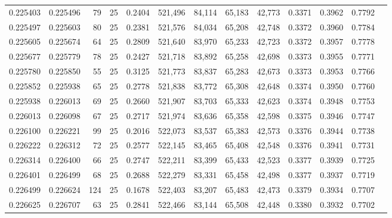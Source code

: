 \begin{tabular}{rrrrrrrrrrrrr}
0.225403 & 0.225496 &    79 &  25 &                                     0.2404 & 521,496 &  84,114 &  65,183 &  42,773 & 0.3371 & 0.3962 & 0.7792 \\
0.225497 & 0.225603 &    80 &  25 &                                     0.2381 & 521,576 &  84,034 &  65,208 &  42,748 & 0.3372 & 0.3960 & 0.7784 \\
0.225605 & 0.225674 &    64 &  25 &                                     0.2809 & 521,640 &  83,970 &  65,233 &  42,723 & 0.3372 & 0.3957 & 0.7778 \\
0.225677 & 0.225779 &    78 &  25 &                                     0.2427 & 521,718 &  83,892 &  65,258 &  42,698 & 0.3373 & 0.3955 & 0.7771 \\
0.225780 & 0.225850 &    55 &  25 &                                     0.3125 & 521,773 &  83,837 &  65,283 &  42,673 & 0.3373 & 0.3953 & 0.7766 \\
0.225852 & 0.225938 &    65 &  25 &                                     0.2778 & 521,838 &  83,772 &  65,308 &  42,648 & 0.3374 & 0.3950 & 0.7760 \\
0.225938 & 0.226013 &    69 &  25 &                                     0.2660 & 521,907 &  83,703 &  65,333 &  42,623 & 0.3374 & 0.3948 & 0.7753 \\
0.226013 & 0.226098 &    67 &  25 &                                     0.2717 & 521,974 &  83,636 &  65,358 &  42,598 & 0.3375 & 0.3946 & 0.7747 \\
0.226100 & 0.226221 &    99 &  25 &                                     0.2016 & 522,073 &  83,537 &  65,383 &  42,573 & 0.3376 & 0.3944 & 0.7738 \\
0.226222 & 0.226312 &    72 &  25 &                                     0.2577 & 522,145 &  83,465 &  65,408 &  42,548 & 0.3376 & 0.3941 & 0.7731 \\
0.226314 & 0.226400 &    66 &  25 &                                     0.2747 & 522,211 &  83,399 &  65,433 &  42,523 & 0.3377 & 0.3939 & 0.7725 \\
0.226401 & 0.226499 &    68 &  25 &                                     0.2688 & 522,279 &  83,331 &  65,458 &  42,498 & 0.3377 & 0.3937 & 0.7719 \\
0.226499 & 0.226624 &   124 &  25 &                                     0.1678 & 522,403 &  83,207 &  65,483 &  42,473 & 0.3379 & 0.3934 & 0.7707 \\
0.226625 & 0.226707 &    63 &  25 &                                     0.2841 & 522,466 &  83,144 &  65,508 &  42,448 & 0.3380 & 0.3932 & 0.7702 \\

\end{tabular}
